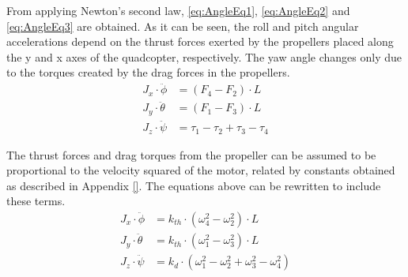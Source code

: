 From applying Newton's second law, \autoref{eq:AngleEq1}, \ref{eq:AngleEq2} and \ref{eq:AngleEq3} are obtained. As it can be seen, the roll and pitch angular accelerations depend on the thrust forces exerted by the propellers placed along the y and x axes of the quadcopter, respectively. The yaw angle changes only due to the torques created by the drag forces in the propellers.
%
\begin{align}
	J_x\cdot\ddot{\phi}&=(F_4-F_2)\cdot L  \label{eq:AngleEq1} \\
	J_y\cdot\ddot{\theta}&=(F_1-F_3)\cdot L  \label{eq:AngleEq2}\\
	J_z\cdot\ddot{\psi}&=\tau_1-\tau_2+\tau_3-\tau_4
	\label{eq:AngleEq3}
\end{align}
\begin{where}
\end{where}

The thrust forces and drag torques from the propeller can be assumed to be proportional to the velocity squared of the motor, related by constants obtained as described in Appendix \ref{}. The equations above can be rewritten to include these terms.
%
\begin{align}
J_x\cdot\ddot{\phi}&=k_{th} \cdot(\omega^2_4-\omega^2_2) \cdot L \\
J_y \cdot\ddot{\theta}&=k_{th} \cdot(\omega^2_1-\omega^2_3) \cdot L \\
J_z\cdot\ddot{\psi}&=k_d \cdot(\omega^2_1-\omega^2_2+\omega^2_3-\omega^2_4)
\label{eq:AngleEqVelocities}
\end{align}

